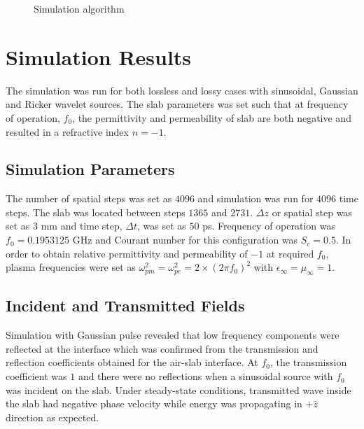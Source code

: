 \begin{figure}[htbp]
\caption{Simulation algorithm}
\label{1D-DNG-Algorithm}
\end{figure}
\section{Simulation Results}
The simulation was run for both lossless and lossy cases with sinusoidal, Gaussian and Ricker wavelet sources. The slab parameters was set such that at frequency of operation, $f_0$, the permittivity and permeability of slab are both negative and resulted in a refractive index $n=-1$.
\subsection{Simulation Parameters}
The number of spatial steps was set as $4096$ and simulation was run for $4096$ time steps. The slab was located between steps $1365$ and $2731$. $\Delta z$ or spatial step was set as $3$ mm and time step, $\Delta t$, was set as $50$ ps. Frequency of operation was $f_0=0.1953125$ GHz and Courant number for this configuration was $S_c=0.5$. In order to obtain relative permittivity and permeability of $-1$ at required $f_0$, plasma frequencies were set as $\omega^2_{pm}=\omega^2_{pe}=2\times(2\pi f_0)^2$ with $\epsilon_\infty=\mu_\infty=1$.
\subsection{Incident and Transmitted Fields}
Simulation with Gaussian pulse revealed that low frequency components were reflected at the interface which was confirmed from the transmission and reflection coefficients obtained for the air-slab interface. At $f_0$, the transmission coefficient was $1$ and there were no reflections when a sinusoidal source with $f_0$ was incident on the slab. Under steady-state conditions, transmitted wave inside the slab had negative phase velocity while energy was propagating in $+\hat{z}$ direction as expected.
